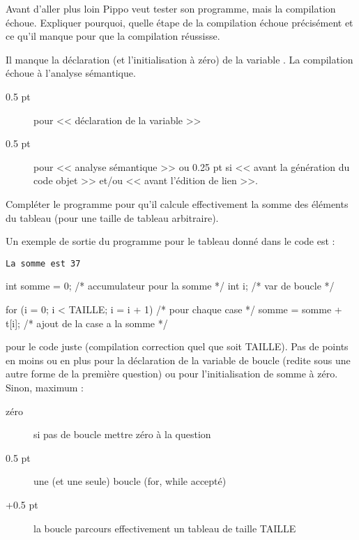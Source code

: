 \question Avant d'aller plus loin Pippo veut tester son programme,
mais la compilation échoue. Expliquer pourquoi, quelle étape de la
compilation échoue précisément et ce qu'il manque pour que la
compilation réussisse.  

\begin{correction}
Il manque la déclaration (et l'initialisation à zéro) de la variable
. La compilation échoue à l'analyse sémantique. 
\begin{baremeenv}
  \begin{description}
  \item[0.5 pt] pour << déclaration de la variable  >>
  \item[0.5 pt] pour << analyse sémantique >> ou 0.25 pt si << avant
    la génération du code objet >> et/ou << avant l'édition de lien
    >>.
  \end{description}
\end{baremeenv}
\end{correction}

\question Compléter le programme pour qu'il calcule effectivement la somme
  des éléments du tableau (pour une taille de tableau arbitraire).

Un exemple de sortie du programme pour le tableau donné dans le code est :
\begin{verbatim}
La somme est 37
\end{verbatim}

\begin{correction}

  \begin{listing}{11}
  int somme = 0; /* accumulateur pour la somme */    
  int i; /* var de boucle */

  for (i = 0; i < TAILLE; i = i + 1) /* pour chaque case */
  {
    somme = somme + t[i]; /* ajout de la case a la somme */   
  }
  \end{listing}

  \begin{baremeenv}
     pour le code juste (compilation correction quel que soit
    TAILLE). Pas de points en moins ou en plus pour la déclaration de
    la variable de boucle (redite sous une autre forme de la première
    question) ou pour l'initialisation de somme à zéro. Sinon, maximum
     :
  \begin{description}
  \item[zéro]  si pas de boucle mettre zéro à la question
  \item[0.5 pt]  une (et une seule) boucle (for, while accepté)
  \item[+0.5 pt]  la boucle parcours effectivement un tableau de taille TAILLE
 \end{description}
  \end{baremeenv}
\end{correction}


